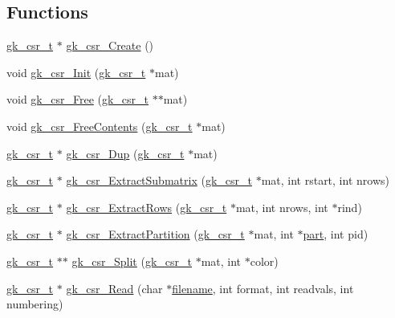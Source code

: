 \subsection*{Functions}
\begin{DoxyCompactItemize}
\item 
\hyperlink{a00634}{gk\+\_\+csr\+\_\+t} $\ast$ \hyperlink{a00023_a82b885bbed5bd18c26629c35ce5d37e4}{gk\+\_\+csr\+\_\+\+Create} ()
\item 
void \hyperlink{a00023_a47a303d88c3316bd821219cae39d0461}{gk\+\_\+csr\+\_\+\+Init} (\hyperlink{a00634}{gk\+\_\+csr\+\_\+t} $\ast$mat)
\item 
void \hyperlink{a00023_ac3736361b8d6b391356f273c960c203b}{gk\+\_\+csr\+\_\+\+Free} (\hyperlink{a00634}{gk\+\_\+csr\+\_\+t} $\ast$$\ast$mat)
\item 
void \hyperlink{a00023_a9646f29b0605ba264bf373c441a6826d}{gk\+\_\+csr\+\_\+\+Free\+Contents} (\hyperlink{a00634}{gk\+\_\+csr\+\_\+t} $\ast$mat)
\item 
\hyperlink{a00634}{gk\+\_\+csr\+\_\+t} $\ast$ \hyperlink{a00023_a24144cf4c30d5ec4ed8b488d371476b3}{gk\+\_\+csr\+\_\+\+Dup} (\hyperlink{a00634}{gk\+\_\+csr\+\_\+t} $\ast$mat)
\item 
\hyperlink{a00634}{gk\+\_\+csr\+\_\+t} $\ast$ \hyperlink{a00023_a0b106b838c4dc370c32a47aaaf990375}{gk\+\_\+csr\+\_\+\+Extract\+Submatrix} (\hyperlink{a00634}{gk\+\_\+csr\+\_\+t} $\ast$mat, int rstart, int nrows)
\item 
\hyperlink{a00634}{gk\+\_\+csr\+\_\+t} $\ast$ \hyperlink{a00023_aaa2391cce5eb8291e65f6dc4d8e252fd}{gk\+\_\+csr\+\_\+\+Extract\+Rows} (\hyperlink{a00634}{gk\+\_\+csr\+\_\+t} $\ast$mat, int nrows, int $\ast$rind)
\item 
\hyperlink{a00634}{gk\+\_\+csr\+\_\+t} $\ast$ \hyperlink{a00023_ac59047c4a89fa4680d746fcdce4aa1a7}{gk\+\_\+csr\+\_\+\+Extract\+Partition} (\hyperlink{a00634}{gk\+\_\+csr\+\_\+t} $\ast$mat, int $\ast$\hyperlink{a00879_a0a9ea8670f88d6db1e021fee2dcd94be}{part}, int pid)
\item 
\hyperlink{a00634}{gk\+\_\+csr\+\_\+t} $\ast$$\ast$ \hyperlink{a00023_ac438fca404c3f1ff6989aa68f83ed241}{gk\+\_\+csr\+\_\+\+Split} (\hyperlink{a00634}{gk\+\_\+csr\+\_\+t} $\ast$mat, int $\ast$color)
\item 
\hyperlink{a00634}{gk\+\_\+csr\+\_\+t} $\ast$ \hyperlink{a00023_a8ebc19fe9a291bdf67677ebdaae56592}{gk\+\_\+csr\+\_\+\+Read} (char $\ast$\hyperlink{a00623_a42a21beb8018ac623f4d09db1343b9cf}{filename}, int format, int readvals, int numbering)
\item 

\end{DoxyCompactItemize}
